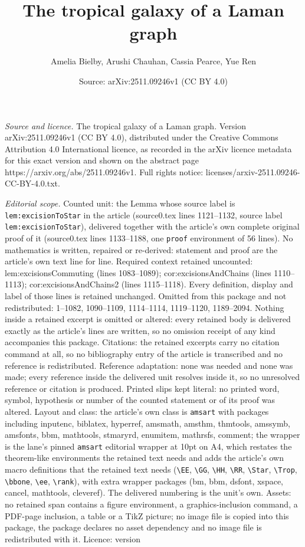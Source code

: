 \documentclass[10pt,a4paper]{amsart}
\title[The tropical galaxy of a Laman graph]{The tropical galaxy of a Laman graph}
\author{Amelia Bielby, Arushi Chauhan, Cassia Pearce, Yue Ren}
\date{Source: arXiv:2511.09246v1 (CC BY 4.0)}
\begin{document}
\maketitle

\noindent\emph{Source and licence.} The tropical galaxy of a Laman graph. Version arXiv:2511.09246v1 (CC BY 4.0), distributed under the Creative Commons Attribution 4.0 International licence, as recorded in the arXiv licence metadata for this exact version and shown on the abstract page https://arxiv.org/abs/2511.09246v1. Full rights notice: licenses/arxiv-2511.09246-CC-BY-4.0.txt.\par\smallskip

\noindent\textit{Editorial scope.} Counted unit: the Lemma whose source label is \texttt{lem:excisionToStar} in the article (source0.tex lines 1121--1132, source label \texttt{lem:excisionToStar}), delivered together with the article's own complete original proof of it (source0.tex lines 1133--1188, one \texttt{proof} environment of 56 lines). No mathematics is written, repaired or re-derived: statement and proof are the article's own text line for line. Required context retained uncounted: lem:excisionsCommuting (lines 1083--1089); cor:excisionsAndChains (lines 1110--1113); cor:excisionsAndChains2 (lines 1115--1118). Every definition, display and label of those lines is retained unchanged. Omitted from this package and not redistributed: 1--1082, 1090--1109, 1114--1114, 1119--1120, 1189--2094. Nothing inside a retained excerpt is omitted or altered: every retained body is delivered exactly as the article's lines are written, so no omission receipt of any kind accompanies this package. Citations: the retained excerpts carry no citation command at all, so no bibliography entry of the article is transcribed and no reference is redistributed. Reference adaptation: none was needed and none was made; every reference inside the delivered unit resolves inside it, so no unresolved reference or citation is produced. Printed slips kept literal: no printed word, symbol, hypothesis or number of the counted statement or of its proof was altered. Layout and class: the article's own class is \texttt{amsart} with packages including inputenc, biblatex, hyperref, amsmath, amsthm, thmtools, amssymb, amsfonts, bbm, mathtools, stmaryrd, enumitem, mathrsfs, comment; the wrapper is the lane's pinned \texttt{amsart} editorial wrapper at 10pt on A4, which restates the theorem-like environments the retained text needs and adds the article's own macro definitions that the retained text needs (\texttt{\textbackslash EE}, \texttt{\textbackslash GG}, \texttt{\textbackslash HH}, \texttt{\textbackslash RR}, \texttt{\textbackslash Star}, \texttt{\textbackslash Trop}, \texttt{\textbackslash bbone}, \texttt{\textbackslash ee}, \texttt{\textbackslash rank}), with extra wrapper packages (bm, bbm, dsfont, xspace, cancel, mathtools, cleveref). The delivered numbering is the unit's own. Assets: no retained span contains a figure environment, a graphics-inclusion command, a PDF-page inclusion, a table or a TikZ picture; no image file is copied into this package, the package declares no asset dependency and no image file is redistributed with it. Licence: version 
\end{document}
